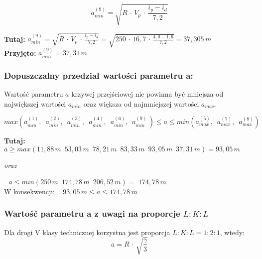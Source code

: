 \documentclass[12pt]{article}
\begin{document}
            \begin{equation}
                a_{min}^{(9)} = \sqrt{ R \,\cdot\, V_{p} \,\cdot\, \frac{ i_{p} - i_{d} }{ 7,2 } }
            \end{equation}
            
            \textbf{Tutaj:} \( a_{min}^{(9)} = \sqrt{ R \,\cdot\, V_{p} \,\cdot\, \frac{ i_{p} - i_{d} }{ 7,2 } }
            = \sqrt{250 \,\cdot\, 16,7 \,\cdot\, \frac{4,0 - 1,6}{7,2} } = 37,305\,m \)\\

            \textbf{Przyjęto:} \( a_{min}^{(9)} = 37,31\,m \)

        \subsubsection{Dopuszczalny przedział wartości parametru \textbf{a}:}
            Wartość parametru \( a \) krzywej przejściowej nie powinna być mniejsza od największej wartości \( a_{min} \)
            oraz większa od najmniejszej wartości \( a_{max} \).

            \begin{equation}
                max(a_{min}^{(1)},\,\,\, a_{min}^{(2)},\,\,\, a_{min}^{(3)},\,\,\, a_{min}^{(4)},\,\,\,
                a_{min}^{(6)},\,\,\, a_{min}^{(9)}\,)\leq a \leq min(a_{max}^{(5)},\,\,\, a_{max}^{(7)},\,\,\, a_{max}^{(8)})  
            \end{equation}

            \textbf{Tutaj:} \( a \geq max(11,88\,m\,\,\,53,03\,m\,\,\,78,21\,m\,\,\,83,33\,m\,\,\,93,05\,m\,\,\,37,31\,m)=93,05\,m \)
            \begin{center} \textit{oraz} \end{center}
            \qquad \quad\,\, \( a \leq min(250\,m\,\,\,174,78\,m\,\,\,206,52\,m )=\,\,174,78\,m \)\\

            \qquad \qquad \qquad \qquad \qquad  W konsekwencji: \,\,\,  \( 93,05\,m \leq a \leq 174,78\,m \)
            \newpage

        \subsubsection{Wartość parametru a z uwagi na proporcje \(L:K:L\)}
                Dla drogi V klasy technicznej korzystna jest proporcja \(L:K:L = 1:2:1\), wtedy:
                \begin{equation}
                    a = R \,\cdot\, \sqrt{\frac{\gamma}{3}}
                \end{equation}
\end{document}
